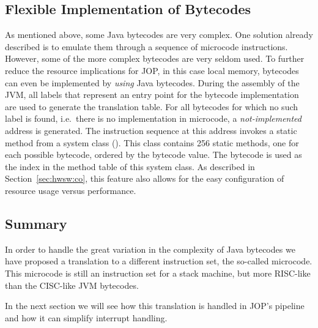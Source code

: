 \subsection{Flexible Implementation of Bytecodes}

As mentioned above, some Java bytecodes are very complex. One
solution already described is to emulate them through a sequence of
microcode instructions. However, some of the more complex bytecodes
are very seldom used. To further reduce the resource implications
for JOP, in this case local memory, bytecodes can even be
implemented by \emph{using} Java bytecodes. During the assembly of
the JVM, all labels that represent an entry point for the bytecode
implementation are used to generate the translation table. For all
bytecodes for which no such label is found, i.e.\ there is no
implementation in microcode, a \emph{not-implemented} address is
generated. The instruction sequence at this address invokes a static
method from a system class (). This
class contains 256 static methods, one for each possible bytecode,
ordered by the bytecode value. The bytecode is used as the index in
the method table of this system class. As described in
Section~\ref{sec:hwsw:co}, this feature also allows for the easy
configuration of resource usage versus performance.

\subsection{Summary}

In order to handle the great variation in the complexity of Java
bytecodes we have proposed a translation to a different instruction
set, the so-called microcode. This microcode is still an instruction
set for a stack machine, but more RISC-like than the CISC-like JVM
bytecodes.

In the next section we will see how this translation is handled in
JOP's pipeline and how it can simplify interrupt handling.


%


